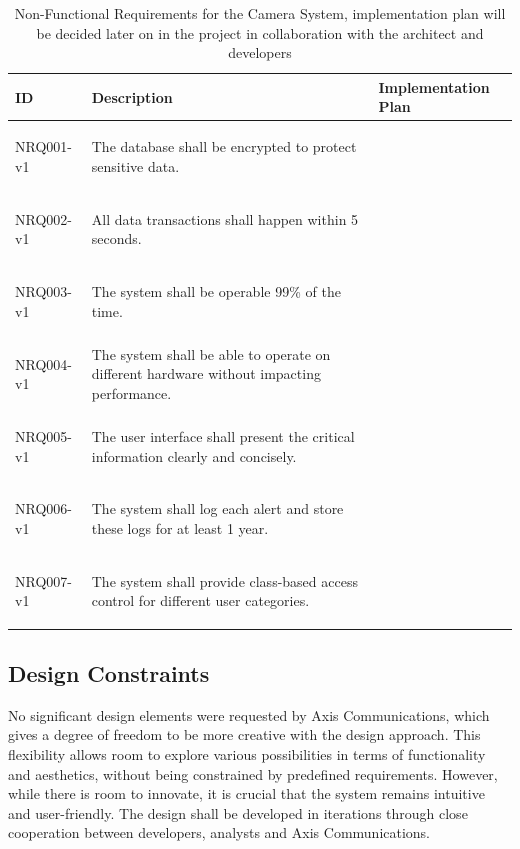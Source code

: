\documentclass{article}
\begin{document}
\begin{table}[h!]
\centering
\begin{tabular}{|l|p{8cm}|p{5cm}|}
\hline
\textbf{ID} & \textbf{Description} & \textbf{Implementation Plan} \\
\hline
\hypertarget{NRQ001}{NRQ001-v1} & The database shall be encrypted to protect sensitive data. & \\
\hline
\hypertarget{NRQ002}{NRQ002-v1} & All data transactions shall happen within 5 seconds. & \\
\hline
\hypertarget{NRQ003}{NRQ003-v1} & The system shall be operable 99\% of the time. & \\
\hline
\hypertarget{NRQ004}{NRQ004-v1} & The system shall be able to operate on different hardware without impacting performance. & \\
\hline
\hypertarget{NRQ005}{NRQ005-v1} & The user interface shall present the critical information clearly and concisely. & \\
\hline
\hypertarget{NRQ006}{NRQ006-v1} & The system shall log each alert and store these logs for at least 1 year. & \\
\hline
\hypertarget{NRQ007}{NRQ007-v1} & The system shall provide class-based access control for different user categories. & \\
\hline
\end{tabular}
\captionsetup{justification=centering}
\caption{Non-Functional Requirements for the Camera System, implementation plan will be decided later on in the project in collaboration with the architect and developers}
\label{table:nonfunctional_requirements}
\end{table}

\clearpage


\subsection{Design Constraints}


No significant design elements were requested by Axis Communications, which gives a degree of freedom to be more creative with the design approach. This flexibility allows room to explore various possibilities in terms of functionality and aesthetics, without being constrained by predefined requirements. However, while there is room to innovate, it is crucial that the system remains intuitive and user-friendly. The design shall be developed in iterations through close cooperation between developers, analysts and Axis Communications.
\end{document}
